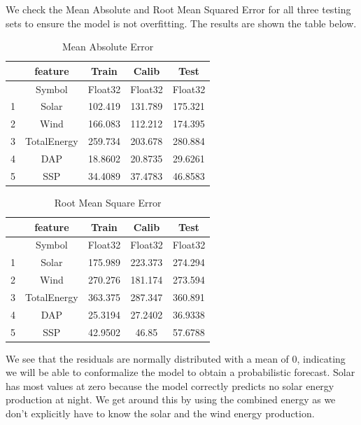 \documentclass[
  journal,
]{IEEEtran}%
\begin{document}
We check the Mean Absolute and Root Mean Squared Error for all three
testing sets to ensure the model is not overfitting. The results are
shown the table below.

\label{test-error}
\begin{table}
\caption{Mean Absolute Error}\tabularnewline

\centering
\begin{tabular}{r|cccc}
    & feature & Train & Calib & Test\\
    \hline
    & Symbol & Float32 & Float32 & Float32\\
    \hline
    1 & Solar & 102.419 & 131.789 & 175.321 \\
    2 & Wind & 166.083 & 112.212 & 174.395 \\
    3 & TotalEnergy & 259.734 & 203.678 & 280.884 \\
    4 & DAP & 18.8602 & 20.8735 & 29.6261 \\
    5 & SSP & 34.4089 & 37.4783 & 46.8583 \\
\end{tabular}
\end{table}

\label{test-error-squared}
\begin{table}
\caption{Root Mean Square Error}\tabularnewline

\centering
\begin{tabular}{r|cccc}
    & feature & Train & Calib & Test\\
    \hline
    & Symbol & Float32 & Float32 & Float32\\
    \hline
    1 & Solar & 175.989 & 223.373 & 274.294 \\
    2 & Wind & 270.276 & 181.174 & 273.594 \\
    3 & TotalEnergy & 363.375 & 287.347 & 360.891 \\
    4 & DAP & 25.3194 & 27.2402 & 36.9338 \\
    5 & SSP & 42.9502 & 46.85 & 57.6788 \\
\end{tabular}
\end{table}

We see that the residuals are normally distributed with a mean of 0,
indicating we will be able to conformalize the model to obtain a
probabilistic forecast. Solar has most values at zero because the model
correctly predicts no solar energy production at night. We get around
this by using the combined energy as we don't explicitly have to know
the solar and the wind energy production.
\end{document}
